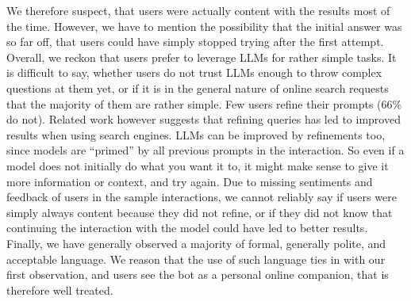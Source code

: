 We therefore suspect, that users were actually content with the results most of the time.
However, we have to mention the possibility that the initial answer was so far off,
that users could have simply stopped trying after the first attempt.
Overall, we reckon that users prefer to leverage LLMs for rather simple tasks.
It is difficult to say, whether users do not trust LLMs enough to throw complex questions at
them yet, or if it is in the general nature of online search requests that the majority of
them are rather simple.
Few users refine their prompts (66\% do not).
Related work however suggests that refining queries has led to improved results when using search
engines.
LLMs can be improved by refinements too, since models are “primed” by all previous prompts in
the interaction.
So even if a model does not initially do what you want it to, it might make
sense to give it more information or context, and try again.
Due to missing sentiments and feedback of users in the sample interactions, we cannot reliably say
if users were simply always content because they did not refine, or if they did not know that
continuing the interaction with the model could have led to better results.
Finally, we have generally observed a majority of formal, generally polite, and acceptable language.
We reason that the use of such language ties in with our first observation, and users see
the bot as a personal online companion, that is therefore well treated.

